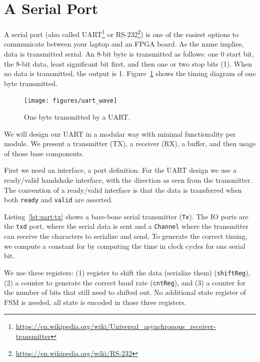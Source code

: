 \documentclass[%
    10pt,
    headinclude, footexclude,
    openright, %
    notitlepage,
    cleardoubleempty,
    headsepline,
    pointlessnumbers,
    bibtotoc, idxtotoc,
    ]{scrbook}
\newcommand{\code}[1]{{\small{\texttt{#1}}}}
\newcommand{\myref}[2]{\href{#1}{#2}}
\renewcommand{\myref}[2]{{#2}{\footnote{\url{#1}}}}
\begin{document}


\section{A Serial Port}

A serial port (also called
\myref{https://en.wikipedia.org/wiki/Universal_asynchronous_receiver-transmitter}{UART}
or \myref{https://en.wikipedia.org/wiki/RS-232}{RS-232}) is one of the easiest options
to communicate between your laptop and an FPGA board.
As the name implies, data is transmitted serial. An 8-bit byte is transmitted as follows:
one 0 start bit, the 8-bit data, least significant bit first, and then one or two stop
bits (1). When no data is transmitted, the output is 1.
Figure~\ref{fig:uart:wave} shows the timing diagram of one byte transmitted.

\begin{figure}
  \centering
  \texttt{[image: figures/uart\_wave]}
  \caption{One byte transmitted by a UART.}
  \label{fig:uart:wave}
\end{figure}

We will design our UART in a modular way with minimal functionality
per module. We present a transmitter (TX), a receiver (RX),
a buffer, and then usage of those base components.

First we need an interface, a port definition.
For the UART design we use a ready/valid handshake interface,
with the direction as seen from the transmitter.
The convention of a ready/valid interface is that the data is transferred
when both \code{ready} and \code{valid} are asserted.


Listing~\ref{lst:uart:tx} shows a bare-bone serial transmitter (\code{Tx}).
The IO ports are the \code{txd} port, where the serial data is sent and
a \code{Channel} where the transmitter can receive the characters to serialize
and send.
To generate the correct timing, we compute a constant for by computing
the time in clock cycles for one serial bit.

We use three registers:
(1) register to shift the data (serialize them) (\code{shiftReg}),
(2) a counter to generate the correct baud rate (\code{cntReg}), and
(3) a counter for the number of bits that still need to shifted out.
No additional state register of FSM is needed, all state is encoded in
those three registers.
\end{document}
